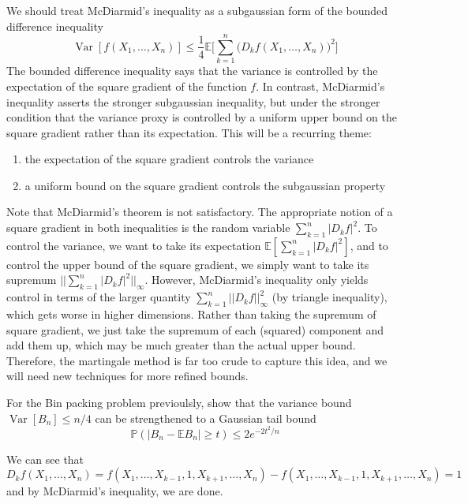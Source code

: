 \documentclass{article}
\DeclareMathOperator{\Var}{Var}
\begin{document}
  We should treat McDiarmid's inequality as a subgaussian form of the bounded difference inequality 
  \[\Var[ f(X_1, \ldots, X_n)] \leq \frac{1}{4} \mathbb{E} \bigg[ \sum_{k=1}^n \big(D_k f (X_1, \ldots, X_n)\big)^2 \bigg]\]
  The bounded difference inequality says that the variance is controlled by the expectation of the square gradient of the function $f$. In contrast, McDiarmid's inequality asserts the stronger subgaussian inequality, but under the stronger condition that the variance proxy is controlled by a uniform upper bound on the square gradient rather than its expectation. This will be a recurring theme: 
  \begin{enumerate}
      \item the expectation of the square gradient controls the variance 
      \item a uniform bound on the square gradient controls the subgaussian property
  \end{enumerate}
  Note that McDiarmid's theorem is not satisfactory. The appropriate notion of a square gradient in both inequalities is the random variable $\sum_{k=1}^n |D_k f|^2$. To control the variance, we want to take its expectation $\mathbb{E} [\sum_{k=1}^n |D_k f|^2]$, and to control the upper bound of the square gradient, we simply want to take its supremum $|| \sum_{k=1}^n |D_k f|^2||_\infty$. However, McDiarmid's inequality only yields control in terms of the larger quantity $\sum_{k=1}^n || D_k f||^2_\infty$ (by triangle inequality), which gets worse in higher dimensions. Rather than taking the supremum of square gradient, we just take the supremum of each (squared) component and add them up, which may be much greater than the actual upper bound. Therefore, the martingale method is far too crude to capture this idea, and we will need new techniques for more refined bounds. 

  \begin{exercise}
  For the Bin packing problem previoulsly, show that the variance bound $\Var[B_n] \leq n/4$ can be strengthened to a Gaussian tail bound 
  \[\mathbb{P}(|B_n - \mathbb{E} B_n| \geq t) \leq 2e^{-2t^2/n}\]
  \end{exercise}
  \begin{solution}
  We can see that 
  \[D_k f(X_1, \ldots, X_n) = f(X_1, \ldots, X_{k-1}, 1, X_{k+1}, \ldots, X_n) - f(X_1, \ldots, X_{k-1}, 1, X_{k+1}, \ldots, X_n) = 1\]
  and by McDiarmid's inequality, we are done. 
  \end{solution}

  \begin{exercise}

  \end{exercise}
\end{document}
